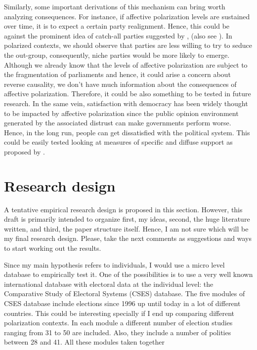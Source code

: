 \documentclass[a4paper, svgnames]{article}
\begin{document}
Similarly, some important derivations of this mechanism can bring worth analyzing consequences. For instance, if affective polarization levels are sustained over time, it is to expect a certain party realignment. Hence, this could be against the prominent idea of catch-all parties suggested by \cite{Kirchheimer1966}, (also see \cite{Krouwel2003}). In polarized contexts, we should observe that parties are less willing to try to seduce the out-group, consequently, niche parties would be more likely to emerge. Although we already know that the levels of affective polarization are subject to the fragmentation of parliaments \citep{Orriols2020} and hence, it could arise a concern about reverse causality, we don't have much information about the consequences of affective polarization. Therefore, it could be also something to be tested in future research. In the same vein, satisfaction with democracy has been widely thought to be impacted by affective polarization since the public opinion environment generated by the associated distrust can make governments perform worse. Hence, in the long run, people can get dissatisfied with the political system. This could be easily tested looking at measures of specific and diffuse support as proposed by \cite{Easton1975}.



\section{Research design}

A tentative empirical research design is proposed in this section. However, this draft is primarily intended to organize first, my ideas, second, the huge literature written, and third, the paper structure itself. Hence, I am not sure which will be my final research design. Please, take the next comments as suggestions and ways to start working out the results.

Since my main hypothesis refers to individuals, I would use a micro level database to empirically test it. One of the possibilities is to use a very well known international database with electoral data at the individual level: the Comparative Study of Electoral Systems (CSES) database. The five modules of CSES database include elections since 1996 up until today in a lot of different countries. This could be interesting specially if I end up comparing different polarization contexts. In each module a different number of election studies ranging from 31 to 50 are included. Also, they include a number of polities between 28 and 41. All these modules taken together 
\end{document}

